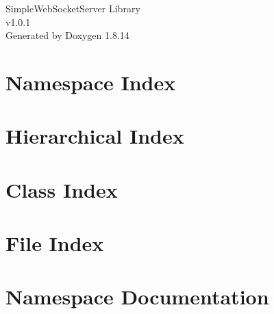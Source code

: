 \documentclass[twoside]{book}
\newcommand{\+}{\discretionary{\mbox{\scriptsize$\hookleftarrow$}}{}{}}
\newcommand{\clearemptydoublepage}{%
  \newpage{\pagestyle{empty}\cleardoublepage}%
}
\begin{document}
\hypersetup{pageanchor=false,
             bookmarksnumbered=true,
             pdfencoding=unicode
            }
\begin{titlepage}
\vspace*{7cm}
\begin{center}%
{\Large Simple\+Web\+Socket\+Server Library \\[1ex]\large v1.\+0.\+1 }\\
\vspace*{1cm}
{\large Generated by Doxygen 1.8.14}\\
\end{center}
\end{titlepage}
\clearemptydoublepage
{}
\tableofcontents
\clearemptydoublepage
{}
\hypersetup{pageanchor=true}

\chapter{Namespace Index}

\chapter{Hierarchical Index}

\chapter{Class Index}

\chapter{File Index}

\chapter{Namespace Documentation}





\end{document}
